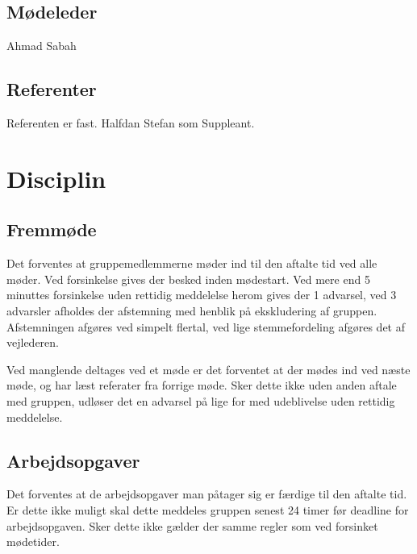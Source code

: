 \documentclass[a4paper,article,11pt,oneside]{memoir}
\begin{document}
\section{Mødeleder}
Ahmad Sabah
\section{Referenter}
Referenten er fast.
Halfdan 
Stefan som Suppleant.
\chapter{Disciplin}
\section{Fremmøde}
Det forventes at gruppemedlemmerne møder ind til den aftalte tid ved alle møder.
Ved forsinkelse gives der besked inden mødestart.  Ved mere end  5 minuttes forsinkelse uden rettidig meddelelse herom gives der 1 advarsel, ved 3 advarsler afholdes der afstemning med henblik på ekskludering af gruppen. Afstemningen afgøres ved simpelt flertal, ved lige stemmefordeling afgøres det af vejlederen.

Ved manglende deltages ved et møde er det forventet at der mødes ind ved næste møde, og har læst referater fra forrige møde. Sker dette ikke uden anden aftale med gruppen, udløser det en advarsel på lige for med udeblivelse uden rettidig meddelelse.

\section{Arbejdsopgaver}
Det forventes at de arbejdsopgaver man påtager sig er færdige til den aftalte tid. Er dette ikke muligt skal dette meddeles gruppen senest 24 timer før deadline for arbejdsopgaven. Sker dette ikke gælder der samme regler som ved forsinket mødetider.


\end{document}
